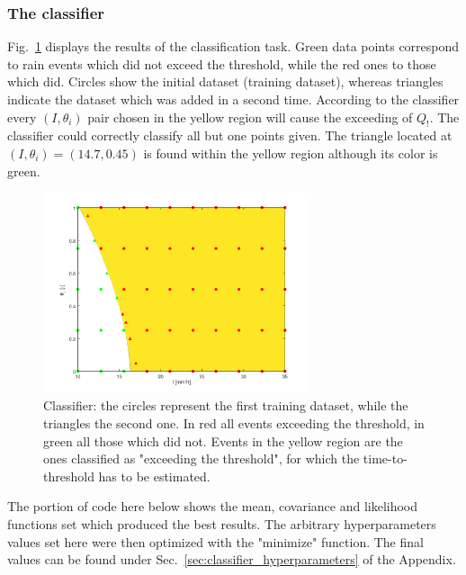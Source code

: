 \subsubsection{The classifier}\label{sec:classifier}

Fig.~\ref{fig:classifier} displays the results of the classification task.
Green data points correspond to rain events which did not exceed the threshold, while the red ones to those which did.
Circles show the initial dataset (training dataset), whereas triangles indicate the dataset which was added in a second time.
According to the classifier every $(I, \theta_i)$ pair chosen in the yellow region will cause the exceeding of $Q_!$.
The classifier could correctly classify all but one points given.
The triangle located at $(I, \theta_i) = (14.7, 0.45)$ is found within the yellow region although its color is green.

\begin{figure}[h]
  \centering
  \includegraphics[width=0.7\textwidth]{Figures/classifier.png}
  \caption{Classifier: the circles represent the first training dataset, while the triangles the second one. In red all events exceeding the threshold, in green all those which did not. Events in the yellow region are the ones classified as "exceeding the threshold", for which the time-to-threshold has to be estimated.}
  \label{fig:classifier}
\end{figure}

The portion of code here below shows the mean, covariance and likelihood functions set which produced the best results.
The arbitrary hyperparameters values set here were then optimized with the "minimize" function.
The final values can be found under Sec.~\ref{sec:classifier_hyperparameters} of the Appendix.\\

